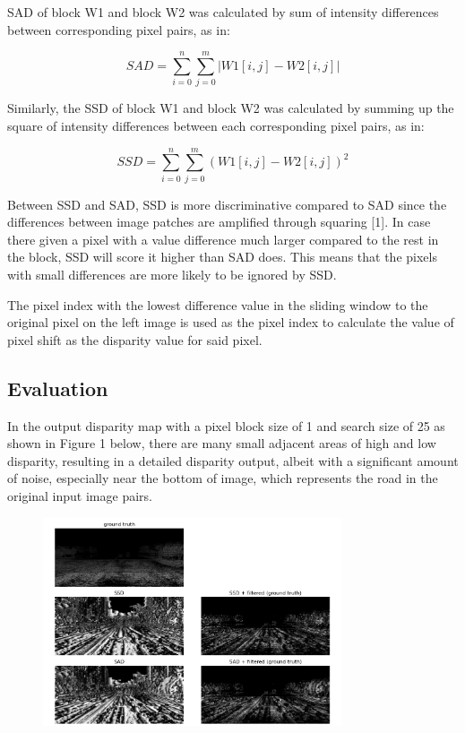 \documentclass[conference]{IEEEtran}
\begin{document}
SAD of block W1 and block W2 was calculated by sum of intensity differences between corresponding pixel pairs, as in:

\begin{equation*}
    SAD=\sum^{n}_{i=0}\sum^{m}_{j=0}|W1[i,j]-W2[i,j]|
\end{equation*}

Similarly, the SSD of block W1 and block W2 was calculated by summing up the square of intensity differences between each corresponding pixel pairs, as in:

\begin{equation*}
    SSD=\sum^{n}_{i=0}\sum^{m}_{j=0}(W1[i,j]-W2[i,j])^2
\end{equation*}

Between SSD and SAD, SSD is more discriminative compared to SAD since the differences between image patches are amplified through squaring [1]. In case there given a pixel with a value difference much larger compared to the rest in the block, SSD will score it higher than SAD does. This means that the pixels with small differences are more likely to be ignored by SSD.

The pixel index with the lowest difference value in the sliding window to the original pixel on the left image is used as the pixel index to calculate the value of pixel shift as the disparity value for said pixel.
\
\subsection{Evaluation}

In the output disparity map with a pixel block size of 1 and search size of 25 as shown in Figure 1 below, there are many small adjacent areas of high and low disparity, resulting in a detailed disparity output, albeit with a significant amount of noise, especially near the bottom of image, which represents the road in the original input image pairs. 

\begin{figure}[H]
    \centering
    \includegraphics[width=8.8cm]{702_output_1_25.png}
\end{figure}
\end{document}
